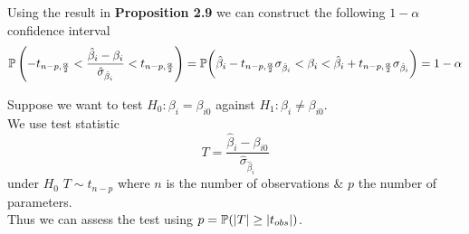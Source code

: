 \documentclass[11pt,a4paper]{article}
\begin{document}
Using the result in \textbf{Proposition 2.9} we can construct the following $1-\alpha$ confidence interval
$$\mathbb{P}\left(-t_{n-p,\frac{\alpha}{2}}<\dfrac{\hat\beta_i-\beta_i}{\hat{\sigma}_{{\hat\beta}_i}}<t_{n-p,\frac\alpha2}\right)=\mathbb{P}\bigg(\hat\beta_i-t_{n-p,\frac{\alpha}2}\sigma_{\hat\beta_i}<\beta_i<\hat\beta_i+t_{n-p,\frac{\alpha}2}\sigma_{\hat\beta_i}\bigg)=1-\alpha$$

Suppose we want to test $H_0:\beta_i=\beta_{i0}$ against $H_1:\beta_i\neq\beta_{i0}$.\\
We use test statistic
$$T=\frac{\hat\beta_i-\beta_{i0}}{\hat\sigma_{\hat\beta_i}}$$
under $H_0$ $T\sim t_{n-p}$ where $n$ is the number of observations \& $p$ the number of parameters.\\
Thus we can assess the test using $p=\mathbb{P}(|T|\geq|t_{obs}|)$.\\
\end{document}
